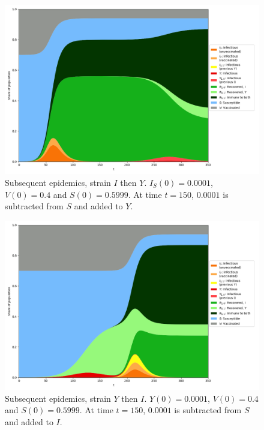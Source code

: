 \documentclass[10pt,a4paper]{article}
\begin{document}
\begin{figure}[ht]\centering
    \includegraphics[width=0.9\linewidth]{../Figures/TwoStrainModel_IthenY_Vacc.png}
    \caption{Subsequent epidemics, strain $I$ then $Y$. $I_S(0)=0.0001$, $V(0)=0.4$ and $S(0)=0.5999$. At time $t=150$, $0.0001$ is subtracted from $S$ and added to $Y$.}
\end{figure}
\begin{figure}[ht]\centering
    \includegraphics[width=0.9\linewidth]{../Figures/TwoStrainModel_YthenI_Vacc.png}
    \caption{Subsequent epidemics, strain $Y$ then $I$. $Y(0)=0.0001$, $V(0)=0.4$ and $S(0)=0.5999$. At time $t=150$, $0.0001$ is subtracted from $S$ and added to $I$.}
\end{figure}
\end{document}

